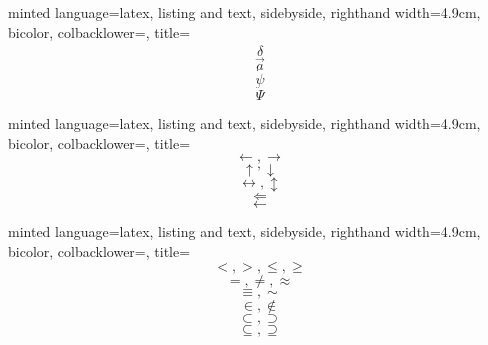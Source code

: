 \documentclass[
    ngerman,
    accentcolor=3b,
    dark_mode,
    fontsize= 12pt,
    a4paper,
    aspectratio=169,
    colorback=true,
    fancy_row_colors,
    leqno,
    fleqn,
    boxarc=3pt,
    fleqn,
]{algoslides}
\begin{document}
    \begin{frame}[c, fragile]
        \slidehead{}
        \begin{codeBlock}[
            ]{
            minted language=latex,
            listing and text,
            sidebyside,
            righthand width=4.9cm,
            bicolor,
            colbacklower=,
            title=
            }
            $$\hat{\delta}$$
            $$\vec{a}$$
            $$\dot{\psi}$$
            $$\ddot{\Psi}$$
        \end{codeBlock}
    \end{frame}

    \begin{frame}[c, fragile]
        \slidehead{}
        \begin{codeBlock}[
            ]{
            minted language=latex,
            listing and text,
            sidebyside,
            righthand width=4.9cm,
            bicolor,
            colbacklower=,
            title=
            }
            $$\leftarrow, \rightarrow$$
            $$\uparrow, \downarrow$$
            $$\leftrightarrow, \updownarrow$$
            $$\Leftarrow$$
            $$\longleftarrow$$
        \end{codeBlock}
    \end{frame}

    \begin{frame}[c, fragile]
        \slidehead{}
        \begin{codeBlock}[
            ]{
            minted language=latex,
            listing and text,
            sidebyside,
            righthand width=4.9cm,
            bicolor,
            colbacklower=,
            title=
            }
            $$<, >, \leq, \geq$$
            $$=, \neq, \approx$$
            $$\equiv, \sim$$
            $$\in, \notin$$
            $$\subset, \supset$$
            $$\subseteq, \supseteq$$
        \end{codeBlock}
    \end{frame}
\end{document}

